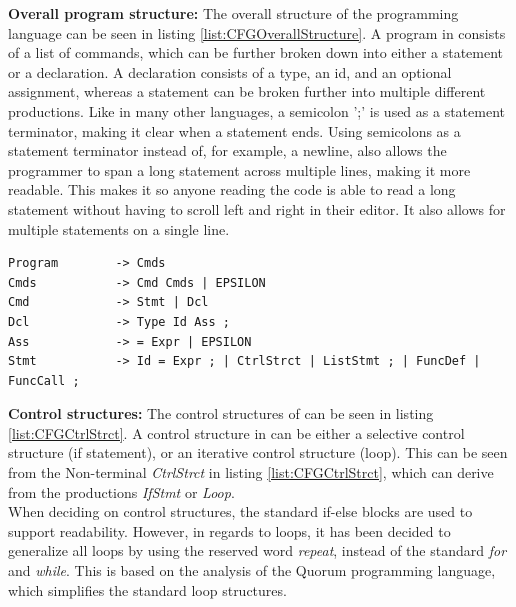 
\textbf{Overall program structure:} The overall structure of the \lang programming language can be seen in listing \ref{list:CFGOverallStructure}. A program in \lang consists of a list of commands, which can be further broken down into either a statement or a declaration. A declaration consists of a type, an id, and an optional assignment, whereas a statement can be broken further into multiple different productions. Like in many other languages, a semicolon ';' is used as a statement terminator, making it clear when a statement ends. Using semicolons as a statement terminator instead of, for example, a newline, also allows the programmer to span a long statement across multiple lines, making it more readable. This makes it so anyone reading the code is able to read a long statement without having to scroll left and right in their editor. It also allows for multiple statements on a single line.\\

\begin{lstlisting}[language=scriptkid, label={list:CFGOverallStructure},caption=Overall structure of \lang CFG]
Program        -> Cmds 
Cmds           -> Cmd Cmds | EPSILON 
Cmd            -> Stmt | Dcl 
Dcl            -> Type Id Ass ; 
Ass            -> = Expr | EPSILON 
Stmt           -> Id = Expr ; | CtrlStrct | ListStmt ; | FuncDef | FuncCall ;
\end{lstlisting}

\noindent\textbf{Control structures: } The control structures of \lang can be seen in listing \ref{list:CFGCtrlStrct}. A control structure in \lang can be either a selective control structure (if statement), or an iterative control structure (loop). This can be seen from the Non-terminal \textit{CtrlStrct} in listing \ref{list:CFGCtrlStrct}, which can derive from the productions \textit{IfStmt} or \textit{Loop}. \\ 
When deciding on control structures, the standard if-else blocks are used to support readability. However, in regards to loops, it has been decided to generalize all loops by using the reserved word \textit{repeat}, instead of the standard \textit{for} and \textit{while}. This is based on the analysis of the Quorum programming language, which simplifies the standard loop structures. 
\\

